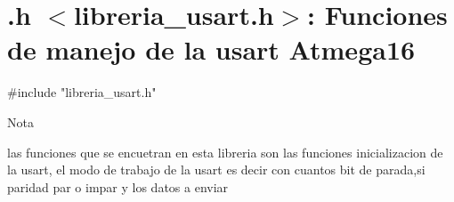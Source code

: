 \hypertarget{group__libreria__usart}{
\section{.h $<$libreria\_\-usart.h$>$: Funciones de manejo de la usart Atmega16}
\label{group__libreria__usart}
}

\begin{DoxyCode}
    #include "libreria_usart.h"
\end{DoxyCode}


\begin{DoxyNote}{Nota}

\end{DoxyNote}
las funciones que se encuetran en esta libreria son las funciones inicializacion de la usart, el modo de trabajo de la usart es decir con cuantos bit de parada,si paridad par o impar y los datos a enviar 